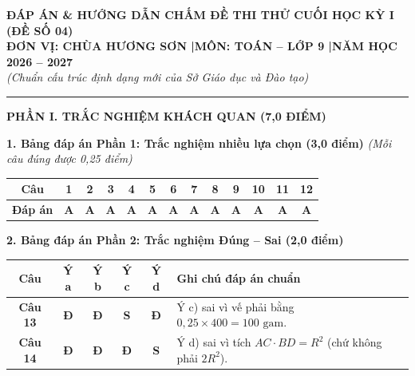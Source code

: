 \documentclass[11pt,a4paper]{article}
\begin{document}
\begin{center}
{\large\bfseries ĐÁP ÁN \& HƯỚNG DẪN CHẤM ĐỀ THI THỬ CUỐI HỌC KỲ I (ĐỀ SỐ 04)}\\[1.5mm]
{\bfseries ĐƠN VỊ: CHÙA HƯƠNG SƠN \quad|\quad MÔN: TOÁN -- LỚP 9 \quad|\quad NĂM HỌC 2026 -- 2027}\\[1mm]
\textit{(Chuẩn cấu trúc định dạng mới của Sở Giáo dục và Đào tạo)}
\end{center}

\vspace{1mm}
\hrule
\vspace{3mm}

\noindent
\textbf{\large PHẦN I. TRẮC NGHIỆM KHÁCH QUAN (7,0 ĐIỂM)}

\vspace{2mm}
\noindent
\textbf{1. Bảng đáp án Phần 1: Trắc nghiệm nhiều lựa chọn (3,0 điểm)} \textit{(Mỗi câu đúng được 0,25 điểm)}
\begin{center}
\begin{tabular}{|c|c|c|c|c|c|c|c|c|c|c|c|c|}
\hline
\textbf{Câu} & \textbf{1} & \textbf{2} & \textbf{3} & \textbf{4} & \textbf{5} & \textbf{6} & \textbf{7} & \textbf{8} & \textbf{9} & \textbf{10} & \textbf{11} & \textbf{12} \\
\hline
\textbf{Đáp án} & \textbf{A} & \textbf{A} & \textbf{A} & \textbf{A} & \textbf{A} & \textbf{A} & \textbf{A} & \textbf{A} & \textbf{A} & \textbf{A} & \textbf{A} & \textbf{A} \\
\hline
\end{tabular}
\end{center}

\vspace{2mm}
\noindent
\textbf{2. Bảng đáp án Phần 2: Trắc nghiệm Đúng -- Sai (2,0 điểm)}
\begin{center}
\begin{tabular}{|c|c|c|c|c|l|}
\hline
\textbf{Câu} & \textbf{Ý a} & \textbf{Ý b} & \textbf{Ý c} & \textbf{Ý d} & \textbf{Ghi chú đáp án chuẩn} \\
\hline
\textbf{Câu 13} & \textbf{Đ} & \textbf{Đ} & \textbf{S} & \textbf{Đ} & Ý c) sai vì vế phải bằng $0{,}25 \times 400 = 100\text{ gam}$. \\
\hline
\textbf{Câu 14} & \textbf{Đ} & \textbf{Đ} & \textbf{Đ} & \textbf{S} & Ý d) sai vì tích $AC \cdot BD = R^2$ (chứ không phải $2R^2$). \\
\hline
\end{tabular}
\end{center}
\end{document}
